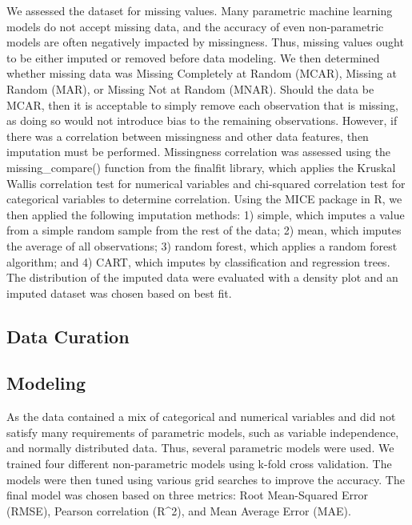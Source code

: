 \documentclass[11pt,]{article}
\begin{document}
We assessed the dataset for missing values. Many parametric machine
learning models do not accept missing data, and the accuracy of even
non-parametric models are often negatively impacted by missingness.
Thus, missing values ought to be either imputed or removed before data
modeling. We then determined whether missing data was Missing Completely
at Random (MCAR), Missing at Random (MAR), or Missing Not at Random
(MNAR). Should the data be MCAR, then it is acceptable to simply remove
each observation that is missing, as doing so would not introduce bias
to the remaining observations. However, if there was a correlation
between missingness and other data features, then imputation must be
performed. Missingness correlation was assessed using the
missing\_compare() function from the finalfit library, which applies the
Kruskal Wallis correlation test for numerical variables and chi-squared
correlation test for categorical variables to determine correlation.
Using the MICE package in R, we then applied the following imputation
methods: 1) simple, which imputes a value from a simple random sample
from the rest of the data; 2) mean, which imputes the average of all
observations; 3) random forest, which applies a random forest algorithm;
and 4) CART, which imputes by classification and regression trees. The
distribution of the imputed data were evaluated with a density plot and
an imputed dataset was chosen based on best fit.

\hypertarget{data-curation}{%
\subsection{Data Curation}\label{data-curation}}

\hypertarget{modeling}{%
\subsection{Modeling}\label{modeling}}

As the data contained a mix of categorical and numerical variables and
did not satisfy many requirements of parametric models, such as variable
independence, and normally distributed data. Thus, several parametric
models were used. We trained four different non-parametric models using
k-fold cross validation. The models were then tuned using various grid
searches to improve the accuracy. The final model was chosen based on
three metrics: Root Mean-Squared Error (RMSE), Pearson correlation
(R\^{}2), and Mean Average Error (MAE).
\end{document}
